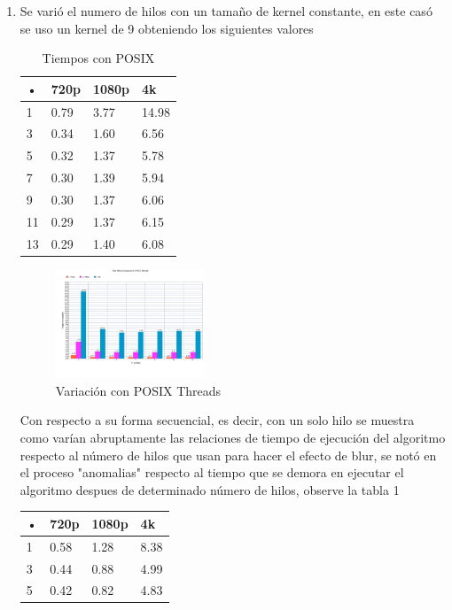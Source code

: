 \documentclass{IEEEtran}
\begin{document}
\begin{enumerate}
\item Se varió el numero de hilos con un tamaño de kernel constante, en este casó se uso un kernel de 9 obteniendo los siguientes valores\\
\begin{table}[H]
\centering
\begin{tabular}{|p{1.5cm}||p{1.5cm}|p{1.5cm}|p{1.5cm}| }
\hline 
•&	720p&	1080p&	4k \\
\hline 
\hline 
1&	0.79&	3.77&	14.98 \\
3&	0.34&	1.60&	6.56 \\
5&	0.32&	1.37&	5.78 \\
7&	0.30&	1.39&	5.94 \\
9&	0.30&	1.37&	6.06 \\
11&	0.29&	1.37&	6.15 \\
13&	0.29&	1.40&	6.08 \\	
\hline		
\end{tabular} 
\caption{Tiempos con POSIX} \label{table:table1}
\end{table}
\begin{figure}[H]
\centering
\includegraphics[width=0.42\textwidth]{graph1}
\caption{Variación con POSIX Threads} \label{fig:fig2}
\end{figure}
Con respecto a su forma secuencial, es decir, con un solo hilo se muestra como varían abruptamente las relaciones de tiempo de ejecución del algoritmo respecto al número de hilos que usan para hacer el efecto de blur, se notó en el proceso "anomalias" respecto al tiempo que se demora en ejecutar el algoritmo despues de determinado número de hilos, observe la tabla 1
\begin{table}[H]
\centering
\begin{tabular}{|p{1.5cm}||p{1.5cm}|p{1.5cm}|p{1.5cm}| }
\hline 
•&	720p&	1080p&	4k \\
\hline 
\hline 
1&	0.58&	1.28&	8.38\\
3&	0.44&	0.88&	4.99\\
5&	0.42&	0.82&	4.83\\

\end{tabular}
\end{table}
\end{enumerate}
\end{document}
